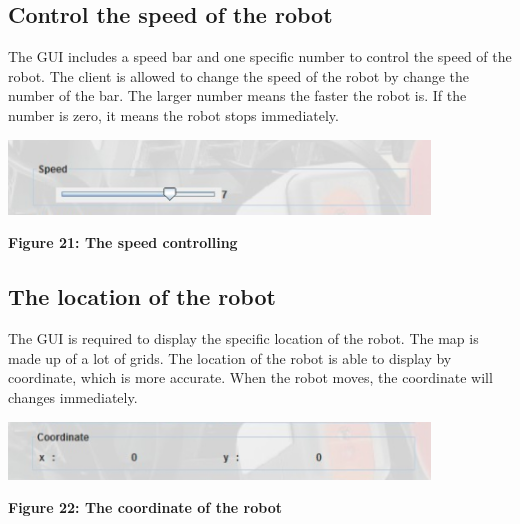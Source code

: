 \documentclass[11pt, a4paper]{report}
\begin{document}
\subsection{Control the speed of the robot}
The GUI includes a speed bar and one specific number to control the speed of the robot. The client is allowed to change the speed of the robot by change the number of the bar. The larger number means the faster the robot is. If the number is zero, it means the robot stops immediately.
  \begin{center}
 \includegraphics[width=11.20cm]{bar}
\end{center}
\begin{center}
\textbf {Figure 21: The speed controlling} \\[0.3cm]
\end{center}    
\subsection{The location of the robot}
The GUI is required to display the specific location of the robot. The map is made up of a lot of grids. The location of the robot is able to display by coordinate, which is more accurate. When the robot moves, the coordinate will changes immediately.
   \begin{center}
 \includegraphics[width=11.20cm]{coordinate}
\end{center}
\begin{center}
\textbf {Figure 22: The coordinate of the robot} \\[0.3cm]
\end{center}        
 
  
\end{document}
